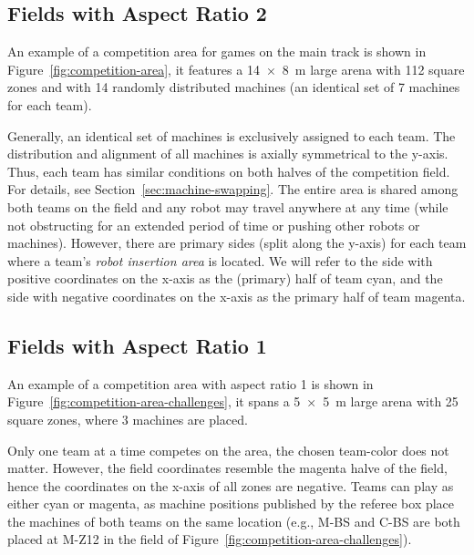 \documentclass[12pt,twoside]{article}
\newcommand{\refsec}[1]{Section~\ref{#1}}
\newcommand{\reffig}[1]{Figure~\ref{#1}}
\begin{document}
\subsection{Fields with Aspect Ratio 2}
\label{sec:competition-area}
An example of a competition area for games on the main track is shown in
\reffig{fig:competition-area}, it
features a \SI{14 x 8}{\metre} large arena with 112 square zones %
and with 14 randomly distributed machines (an identical set of 7 machines for
each team). %

Generally, an identical set of machines is exclusively assigned to each team.
The distribution and alignment of all machines is axially symmetrical
to the y-axis. Thus, each team has similar conditions on both halves of
the competition field.
For details, see \refsec{sec:machine-swapping}.
The entire area is shared among both teams on the field and any robot may travel
anywhere at any time (while not obstructing for an extended period of
time or pushing other robots or machines).
However, there are primary sides (split along the y-axis) for each team where
a team's \textit{robot insertion area} is located.
We will refer to the side with positive coordinates on the x-axis as the
(primary) half of team cyan, and the side with negative coordinates on the
x-axis as the primary half of team magenta.

\subsection{Fields with Aspect Ratio 1}
\label{sec:competition-area-aspect-ratio-1}
An example of a competition area with aspect ratio 1 is shown in
\reffig{fig:competition-area-challenges},
it spans a \SI{5 x 5}{\metre} large %
arena with 25 square zones, where 3 machines are placed.

Only one team at a time competes on the area, the chosen team-color
does not matter. However, the field coordinates resemble the magenta halve
of the field, hence the coordinates on the x-axis of all zones are negative.
Teams can play as either cyan or magenta, as machine positions published by
the referee box place the machines of both teams on the same location
(e.g., M-BS and C-BS are both placed at M-Z12 in the field of
\reffig{fig:competition-area-challenges}).
\end{document}
